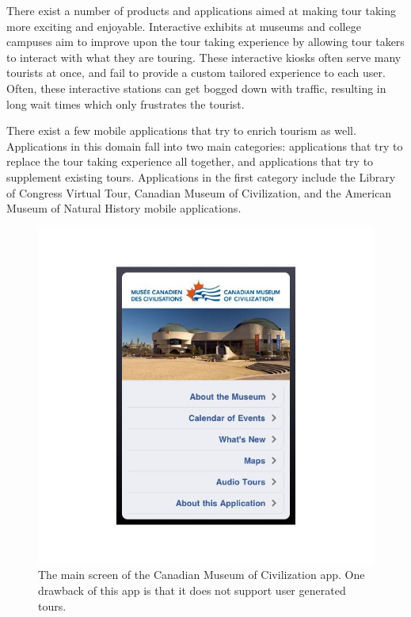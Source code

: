 \documentclass{sigchi}
\begin{document}
There exist a number of products and applications aimed at making tour taking more exciting and enjoyable. Interactive exhibits at museums and college campuses aim to improve upon the tour taking experience by allowing tour takers to interact with what they are touring. These interactive kiosks often serve many tourists at once, and fail to provide a custom tailored experience to each user. Often, these interactive stations can get bogged down with traffic, resulting in long wait times which only frustrates the tourist.

There exist a few mobile applications that try to enrich tourism as well. Applications in this domain fall into two main categories: applications that try to replace the tour taking experience all together, and applications that try to supplement existing tours. Applications in the first category include the Library of Congress Virtual Tour, Canadian Museum of Civilization, and the American Museum of Natural History mobile applications.

\begin{figure}[h]
\centering
\includegraphics[width=1.0\linewidth]{./CanadianMuseumOfCivilization}
\caption{The main screen of the Canadian Museum of Civilization app. One drawback of this app is that it does not support user generated tours.}
\label{fig:CanadianMuseumOfCivilization}
\end{figure}
\end{document}
